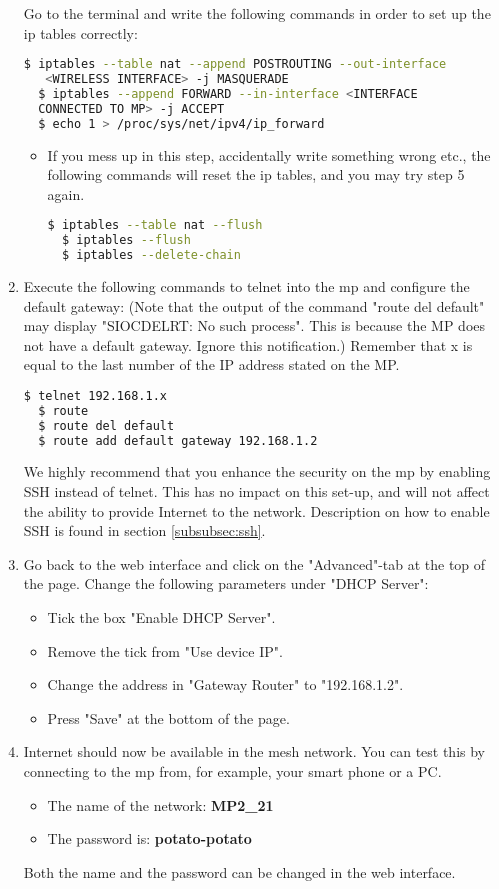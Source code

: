 \begin{enumerate}
Go to the terminal and write the following commands in order to set up the ip tables correctly:
\noindent
\begin{lstlisting}[language=bash]
  $ iptables --table nat --append POSTROUTING --out-interface
   <WIRELESS INTERFACE> -j MASQUERADE
  $ iptables --append FORWARD --in-interface <INTERFACE 
  CONNECTED TO MP> -j ACCEPT
  $ echo 1 > /proc/sys/net/ipv4/ip_forward
\end{lstlisting} 
\begin{itemize}
\item If you mess up in this step, accidentally write something wrong etc., the following commands will reset the ip tables, and you may try step 5 again.
\noindent
\begin{lstlisting}[language=bash]
  $ iptables --table nat --flush
  $ iptables --flush
  $ iptables --delete-chain
\end{lstlisting}
\end{itemize}  

\item Execute the following commands to telnet into the \gls{mp} and configure the default gateway: (Note that the output of the command "route del default" may display "SIOCDELRT: No such process". This is because the MP does not have a default gateway. Ignore this notification.) Remember that x is equal to the last number of the IP address stated on the MP.
\begin{lstlisting}[language=bash]
  $ telnet 192.168.1.x
  $ route 
  $ route del default 
  $ route add default gateway 192.168.1.2
\end{lstlisting} 

We highly recommend that you enhance the security on the \gls{mp} by enabling SSH instead of telnet. This has no impact on this set-up, and will not affect the ability to provide Internet to the network. Description on how to enable SSH is found in section \ref{subsubsec:ssh}.

\item Go back to the web interface and click on the "Advanced"-tab at the top of the page. Change the following parameters under "DHCP Server":
\begin{itemize}
\item Tick the box "Enable DHCP Server".
\item Remove the tick from "Use device IP".
\item Change the address in "Gateway Router" to "192.168.1.2".
\item Press "Save" at the bottom of the page. 
\end{itemize}

\item Internet should now be available in the mesh network. You can test this by connecting to the \gls{mp} from, for example, your smart phone or a PC. 
\begin{itemize}
\item The name of the network: \textbf{MP2_21}
\item The password is: \textbf{potato-potato}
\end{itemize}
Both the name and the password can be changed in the web interface. 
\end{enumerate}
